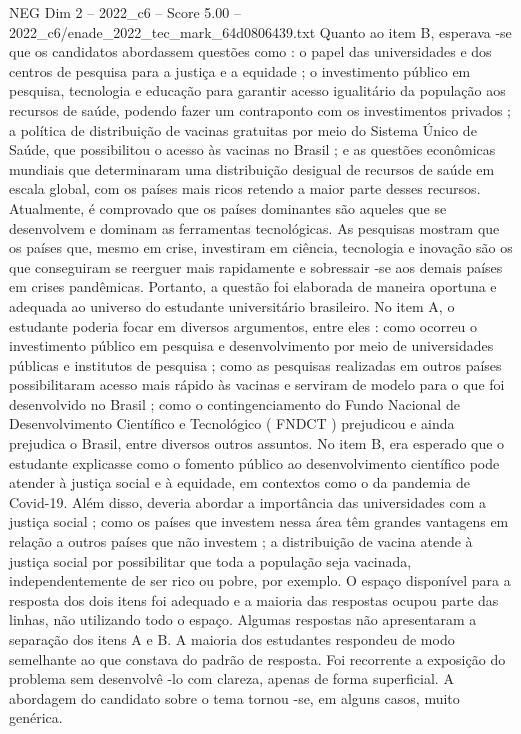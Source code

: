 \begin{textsample}{NEG Dim 2 – 2022\_c6 – Score 5.00 – 2022\_c6/enade\_2022\_tec\_mark\_64d0806439.txt}
Quanto ao item B, esperava -se que os candidatos abordassem questões como : o papel das universidades e dos centros de pesquisa para a justiça e a equidade ; o investimento público em pesquisa, tecnologia e educação para garantir acesso igualitário da população aos recursos de saúde, podendo fazer um contraponto com os investimentos privados ; a política de distribuição de vacinas gratuitas por meio do Sistema Único de Saúde, que possibilitou o acesso às vacinas no Brasil ; e as questões econômicas mundiais que determinaram uma distribuição desigual de recursos de saúde em escala global, com os países mais ricos retendo a maior parte desses recursos.
Atualmente, é comprovado que os países dominantes são aqueles que se desenvolvem e dominam as ferramentas tecnológicas.
As pesquisas mostram que os países que, mesmo em crise, investiram em ciência, tecnologia e inovação são os que conseguiram se reerguer mais rapidamente e sobressair -se aos demais países em crises pandêmicas.
Portanto, a questão foi elaborada de maneira oportuna e adequada ao universo do estudante universitário brasileiro.
No item A, o estudante poderia focar em diversos argumentos, entre eles : como ocorreu o investimento público em pesquisa e desenvolvimento por meio de universidades públicas e institutos de pesquisa ; como as pesquisas realizadas em outros países possibilitaram acesso mais rápido às vacinas e serviram de modelo para o que foi desenvolvido no Brasil ; como o contingenciamento do Fundo Nacional de Desenvolvimento Científico e Tecnológico ( FNDCT ) prejudicou e ainda prejudica o Brasil, entre diversos outros assuntos.
No item B, era esperado que o estudante explicasse como o fomento público ao desenvolvimento científico pode atender à justiça social e à equidade, em contextos como o da pandemia de Covid-19.
Além disso, deveria abordar a importância das universidades com a justiça social ; como os países que investem nessa área têm grandes vantagens em relação a outros países que não investem ; a distribuição de vacina atende à justiça social por possibilitar que toda a população seja vacinada, independentemente de ser rico ou pobre, por exemplo.
O espaço disponível para a resposta dos dois itens foi adequado e a maioria das respostas ocupou parte das linhas, não utilizando todo o espaço.
Algumas respostas não apresentaram a separação dos itens A e B.
A maioria dos estudantes respondeu de modo semelhante ao que constava do padrão de resposta.
Foi recorrente a exposição do problema sem desenvolvê -lo com clareza, apenas de forma superficial.
A abordagem do candidato sobre o tema tornou -se, em alguns casos, muito genérica.

\end{textsample}

